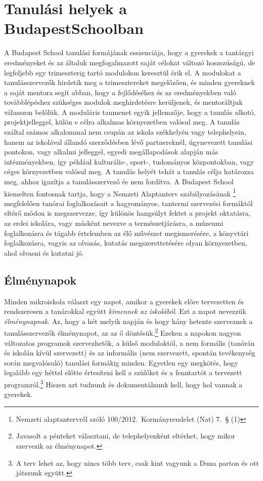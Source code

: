 \section{Tanulási helyek a Budapest\hfill\break Schoolban}

A Budapest School tanulási formájának esszenciája, hogy a gyerekek a tantárgyi eredményeket és az általuk megfogalmazott saját célokat változó hosz\-szúságú, de legfeljebb egy trimeszterig tartó modulokon keresztül érik el. A modulokat a tanulásszervezők hirdetik meg a trimesztereket megelőzően, és minden gyereknek a saját mentora segít abban, hogy a fejlődéséhez és az eredményekben való továbblépéshez szükséges modulok meghirdetésre kerüljenek, és mentoráltjuk válasszon belőlük. A moduláris tanmenet egyik jellemzője, hogy a tanulás alkotó, projektjelleggel, külön e célra alkalmas környezetben valósul meg. A tanulás ezáltal számos alkalommal nem csupán az iskola székhelyén vagy telephelyein, hanem az iskolával állandó szerződésben lévő partnereknél, úgynevezett tanulási pontokon, vagy alkalmi jelleggel, egyedi megállapodások alapján más intézményekben, így például kulturális-, sport-, tudományos központokban, vagy céges környezetben valósul meg. A tanulás helyét tehát a tanulás célja határozza meg, ahhoz igazítja a tanulásszervező és nem fordítva.  A Budapest School kiemelten fontosnak tartja, hogy a Nemzeti Alaptanterv szabályozásának \footnote{Nemzeti alaptantervről szóló 100/2012.~Kormányrendelet (Nat) 7.~§  (1)} megfelelően tanórai foglalkozásait a hagyományos, tantermi szervezési formáktól eltérő módon is megszervezze, így különös hangsúlyt fektet a projekt oktatásra, az erdei iskolára, vagy másként nevezve a természetjárásra, a múzeumi foglalkozásra és tágabb értelemben az élő művészet megismerésére, a könyvtári foglalkozásra, vagyis az olvasás, kutatás megszerettetésére olyan környezetben, ahol olvasni és kutatni jó.

\subsection{Élménynapok}
Minden mikroiskola választ egy napot, amikor a gyerekek előre tervezetten és rendszeresen a tanárokkal együtt \emph{kimennek az iskolából}. Ezt a napot nevezzük \emph{élménynapnak}. Az, hogy a hét melyik napján és hogy hány hetente szerveznek a tanulásszervezők élménynapot, az az ő döntésük.\footnote{Javasolt a pénteket választani, de telephelyenként eltérhet, hogy mikor szervezik az élménynapot.}  Ezeken a napokon nagyon változatos programok szervezhetők, a külső moduloktól, a nem formális (tanórán és iskolán kívül szervezett) és az informális (nem szervezett, spontán tevékenység során megvalósuló) tanulási formákig minden. Egyetlen egy megkötés, hogy legalább egy héttel előtte értesíteni kell a szülőket és a fenntartót a tervezett programról.\footnote{A terv lehet az, hogy nincs több terv, csak kint vagyunk a Duna parton és ott játszunk együtt.} Hiszen azt tudnunk és dokumentálnunk kell, hogy hol vannak a gyerekek.

